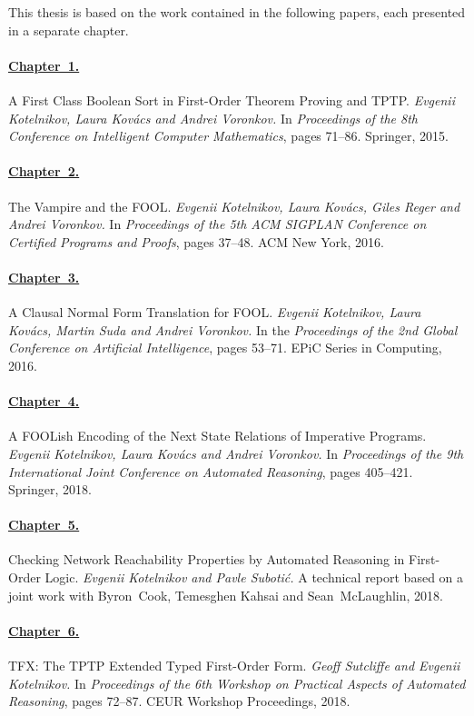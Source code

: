

{

\noindent This thesis is based on the work contained in the following papers, each presented in a separate chapter.

\noindent\paragraph{\hyperref[chap:fool]{Chapter~1.}} A First Class Boolean Sort in First-Order Theorem Proving and TPTP. \emph{Evgenii Kotelnikov, Laura Kov\'acs and Andrei Voronkov.} In \emph{Proceedings of the 8th Conference on Intelligent Computer Mathematics}, pages 71--86. Springer, 2015.

\noindent\paragraph{\hyperref[chap:implementation]{Chapter~2.}} The Vampire and the FOOL. \emph{Evgenii Kotelnikov, Laura Kov\'{a}cs, Giles Reger and Andrei Voronkov.} In \emph{Proceedings of the 5th ACM SIGPLAN Conference on Certified Programs and Proofs}, pages 37--48. ACM New York, 2016.

\noindent\paragraph{\hyperref[chap:cnf]{Chapter~3.}} A Clausal Normal Form Translation for FOOL. \emph{Evgenii Kotelnikov, Laura Kov\'{a}cs, Martin Suda and Andrei Voronkov.} In the \emph{Proceedings of the 2nd Global Conference on Artificial Intelligence}, pages 53--71. EPiC Series in Computing, 2016.

\noindent\paragraph{\hyperref[chap:boogie]{Chapter~4.}} A FOOLish Encoding of the Next State Relations of Imperative Programs. \emph{Evgenii Kotelnikov, Laura Kov\'{a}cs and Andrei Voronkov.} In \emph{Proceedings of the 9th International Joint Conference on Automated Reasoning}, pages 405--421. Springer, 2018.

\noindent\paragraph{\hyperref[chap:aws]{Chapter~5.}} Checking Network Reachability Properties by Automated Reasoning in First-Order Logic. \emph{Evgenii Kotelnikov and Pavle Suboti\'{c}.} A technical report based on a joint work with Byron~Cook, Temesghen Kahsai and Sean~McLaughlin, 2018.

\noindent\paragraph{\hyperref[chap:tfx]{Chapter~6.}} TFX: The TPTP Extended Typed First-Order Form. \emph{Geoff Sutcliffe and Evgenii Kotelnikov.} In \emph{Proceedings of the 6th Workshop on Practical Aspects of Automated Reasoning}, pages 72--87. CEUR Workshop Proceedings, 2018.

}